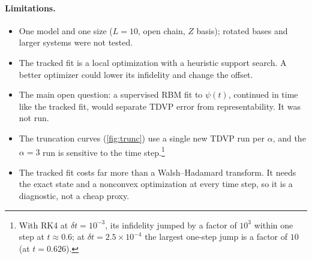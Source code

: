 \documentclass[11pt,a4paper]{article}
\begin{document}
\paragraph{Limitations.}
\begin{itemize}
  \item One model and one size ($L=10$, open chain, $Z$ basis); rotated bases and larger systems were not tested.
  \item The tracked fit is a local optimization with a heuristic support search. A better optimizer could lower its infidelity and change the offset.
  \item The main open question: a supervised RBM fit to $\psi(t)$, continued in time like the tracked fit, would separate TDVP error from representability. It was not run.
  \item The truncation curves (\cref{fig:trunc}) use a single new TDVP run per $\alpha$, and the $\alpha=3$ run is sensitive to the time step.\footnote{With RK4 at $\delta t=10^{-3}$, its infidelity jumped by a factor of $10^3$ within one step at $t\approx0.6$; at $\delta t=2.5\times10^{-4}$ the largest one-step jump is a factor of $10$ (at $t=0.626$).}
  \item The tracked fit costs far more than a Walsh--Hadamard transform. It needs the exact state and a nonconvex optimization at every time step, so it is a diagnostic, not a cheap proxy.
\end{itemize}

\FloatBarrier
\appendix
\end{document}

